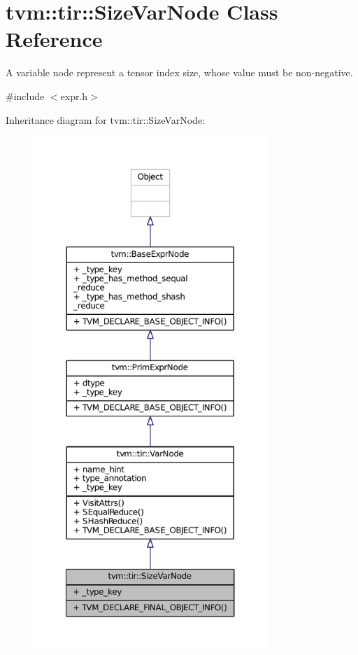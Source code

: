 \hypertarget{classtvm_1_1tir_1_1SizeVarNode}{}\section{tvm\+:\+:tir\+:\+:Size\+Var\+Node Class Reference}
\label{classtvm_1_1tir_1_1SizeVarNode}


A variable node represent a tensor index size, whose value must be non-\/negative.  




{\ttfamily \#include $<$expr.\+h$>$}



Inheritance diagram for tvm\+:\+:tir\+:\+:Size\+Var\+Node\+:
\nopagebreak
\begin{figure}[H]
\begin{center}
\leavevmode
\includegraphics[height=550pt]{classtvm_1_1tir_1_1SizeVarNode__inherit__graph}
\end{center}
\end{figure}


